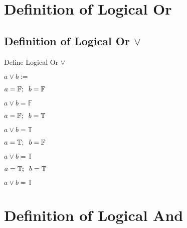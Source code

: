 \documentclass[11pt]{article}
\begin{document}
\newpage
\section{Definition of Logical Or}
\subsection{Definition of Logical Or $\lor$}
\vspace{3mm}
Define Logical Or $\lor$
\begin{center}
$
a \lor b :=
$
\end{center}
$a = \mathbb{F}; \hspace{2mm} b = \mathbb{F}$
\begin{center}
$
a \lor b = \mathbb{F}
$
\end{center}
\vspace{2mm}
$a = \mathbb{F}; \hspace{2mm} b = \mathbb{T}$
\begin{center}
$
a \lor b = \mathbb{T}
$
\end{center}
\vspace{2mm}
$a = \mathbb{T}; \hspace{2mm} b = \mathbb{F}$
\begin{center}
$
a \lor b = \mathbb{T}
$
\end{center}
\vspace{2mm}
$a = \mathbb{T}; \hspace{2mm} b = \mathbb{T}$
\begin{center}
$
a \lor b = \mathbb{T}
$
\end{center}






\section{Definition of Logical And}
\end{document}

